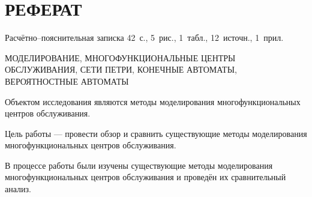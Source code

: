 \chapter*{РЕФЕРАТ}

Расчётно--пояснительная записка 42~с., 5~рис., 1~табл., 12~источн., 1~прил.

\noindent\MakeUppercase{моделирование, многофункциональные центры обслуживания, сети петри, конечные автоматы, вероятностные автоматы}

Объектом исследования являются методы моделирования многофункциональных центров обслуживания.

Цель работы --- провести обзор и сравнить существующие методы моделирования многофункциональных центров обслуживания.

В процессе работы были изучены существующие методы моделирования  многофункциональных центров обслуживания и проведён их сравнительный анализ.

\setcounter{page}{3}